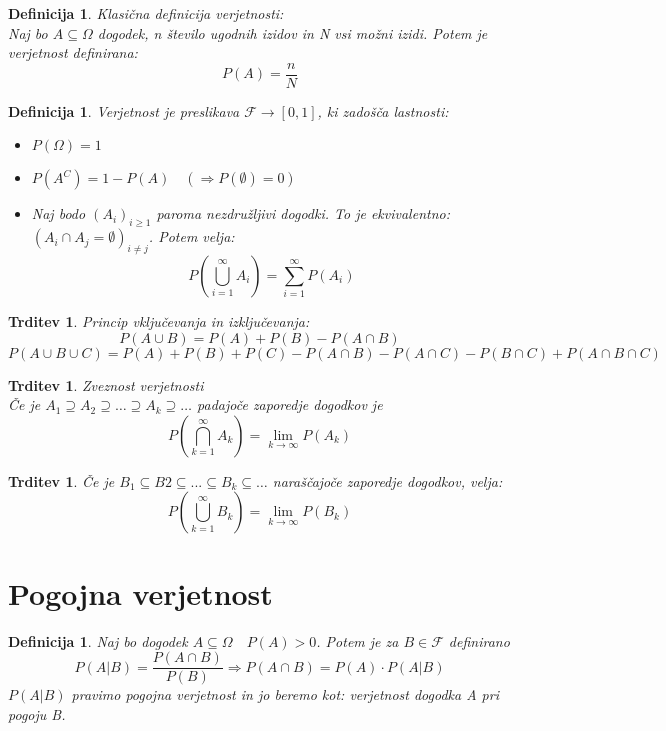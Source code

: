 \documentclass[11pt]{article}
\newtheorem{Trditev}[Izrek]{{\sc Trditev}}
\newtheorem{Definicija}[Izrek]{{\sc Definicija}}
\begin{document}
	\begin{Definicija}
		Klasična definicija verjetnosti:
		\\
		Naj bo  $A\subseteq \Omega $ dogodek, n število ugodnih izidov in N vsi možni izidi. Potem je verjetnost definirana:
		$$P(A) = \frac{n}{N}$$
	\end{Definicija}

		
	\begin{Definicija}
		Verjetnost je preslikava $\mathcal{F}\to [0,1]$, ki zadošča lastnosti:
		\begin{itemize}
			\item
			$P(\Omega) = 1$
			\item
			$P(A^C) = 1 - P(A) \quad (\Rightarrow P(\emptyset) = 0)$
			\item
			Naj bodo $(A_i)_{i \ge 1} $ paroma nezdružljivi dogodki. To je ekvivalentno: $(A_i \cap A_j = \emptyset)_{i\neq j}$. Potem velja:
			$$P(\bigcup_{i =1}^{\infty}A_i) = \sum_{i = 1}^{\infty}P(A_i)$$
		\end{itemize}
	\end{Definicija}
	
	\begin{Trditev}
		Princip vključevanja in izključevanja:
		$$P(A\cup B  ) = P(A) + P(B) - P(A \cap B)$$
		$$P(A \cup B \cup C) = P(A) + P(B) + P(C) - P(A \cap B) - P(A \cap C ) - P(B \cap C) + P(A\cap B \cap C)$$
	\end{Trditev}
	
	\begin{Trditev}
		Zveznost verjetnosti
		\\
		Če je $A_1 \supseteq A_2 \supseteq \dots \supseteq A_k \supseteq \dots $ padajoče zaporedje dogodkov je 
		\[
		P(\bigcap_{k=1}^{\infty} A_k) = \lim\limits_{k \to \infty}{P(A_k)}
		\]
	\end{Trditev}
	\begin{Trditev}
		Če je $ B_1 \subseteq B2 \subseteq ... \subseteq B_k \subseteq \dots$ naraščajoče zaporedje dogodkov, velja:
		\[
		P(\bigcup_{k=1}^{\infty} B_k) = \lim\limits_{k \to \infty}{P(B_k)}
		\]
	\end{Trditev}
	\section{Pogojna verjetnost}
	\begin{Definicija}
		Naj bo dogodek $A \subseteq \Omega \quad P(A) > 0$.
		Potem je  za $B\in \mathcal{F}$ definirano $$P(A|B) = \frac{P(A \cap B)}{P(B)} \Rightarrow P(A\cap B) = P(A) \cdot P(A|B)$$
		$P(A|B)$ pravimo pogojna verjetnost in jo beremo kot: verjetnost dogodka A pri pogoju B.
	\end{Definicija}
	
\end{document}
